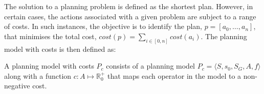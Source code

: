 The solution to a planning problem is defined as the shortest plan. %
However, in certain cases, the actions associated with a given problem are subject to a range of costs.
In such instances, the objective is to identify the plan, $p = \left[a_0, \dots , a_n\right]$, that minimises the total
cost, $cost(p) =  \sum_{i \in [0, n]}cost(a_i)$.
The planning model with costs is then defined as:
\begin{definition}\label{definition:planning-cost}
    A planning model with costs $P_c$ consists of a planning model $P_c = \langle S, s_0, S_G, A, f \rangle$ along with
    a function \linebreak \hbox{$c: A \mapsto \mathbb{R}_0^+$} that maps each operator in the model to a non-negative
    cost.
\end{definition}

